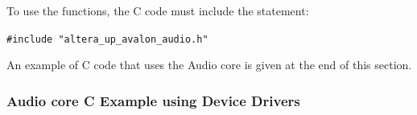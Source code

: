 \documentclass[11pt, twoside, pdftex]{article}
\newcommand{\commonPath}{../../Common}
\begin{document}
To use the functions, the C code must include the statement:

\qquad\texttt{\#include "altera\_up\_avalon\_audio.h"}

An example of C code that uses the Audio core is given at the end of this section.

%


\newpage
\subsubsection{Audio core C Example using Device Drivers }




\end{document}
